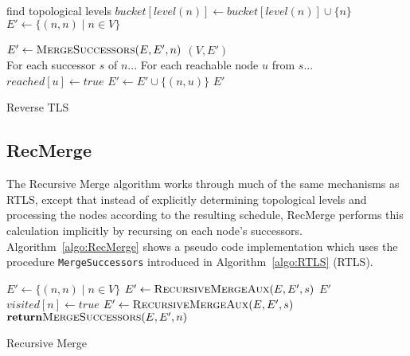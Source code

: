 \documentclass[12pt,a4paper,twoside]{article}
\begin{document}
\begin{algorithm}[h]
  \begin{algorithmic}
    \State find topological levels
      \State $bucket[level(n)] \gets bucket[level(n)] \cup \{n\}$
    \EndFor
    \State $E' \gets \{(n,n) \mid n \in V\}$

        \State $E' \gets \Call{MergeSuccessors}{E, E', n}$
      \EndFor
    \EndFor
    \State \Return $(V, E')$
    \EndFunction
    \\
      \Comment For each successor $s$ of $n$...
        \Comment For each reachable node $u$ from $s$...
            \State $reached[u] \gets true$
            \State $E' \gets E' \cup \{(n,u)\}$
          \EndIf
        \EndFor
      \EndFor
      \State \Return $E'$
    \EndFunction
  \end{algorithmic}
  \caption{Reverse TLS}
  \label{algo:RTLS}
\end{algorithm}

\subsection{RecMerge}

The Recursive Merge algorithm works through much of the same mechanisms as RTLS, except that instead of explicitly determining topological levels and processing the nodes according to the resulting schedule, RecMerge performs this calculation implicitly by recursing on each node's successors. Algorithm~\ref{algo:RecMerge} shows a pseudo code implementation which uses the procedure \verb|MergeSuccessors| introduced in Algorithm~\ref{algo:RTLS} (RTLS).

\begin{algorithm}[h]
\begin{algorithmic}
    \State $E' \gets \{(n, n) \mid n \in V \}$
        \State $E' \gets \Call{RecursiveMergeAux}{E, E', s}$
      \EndIf
    \EndFor
    \State \Return $E'$
  \EndFunction
  \\
    \State $visited[n] \gets true$
        \State $E' \gets \Call{RecursiveMergeAux}{E, E', s}$
      \EndIf
    \EndFor
    \State $\Return \Call{MergeSuccessors}{E, E', n}$
  \EndFunction
\end{algorithmic}
\caption{Recursive Merge}
\label{algo:RecMerge}
\end{algorithm}
\end{document}
